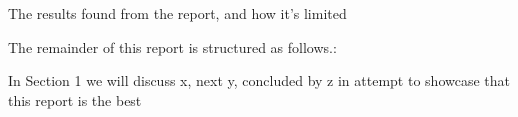 The results found from the report, and how it's limited 

The remainder of this report is structured as follows.:

    In Section 1 we will discuss x, next y, concluded by z in attempt to showcase that this report is the best













